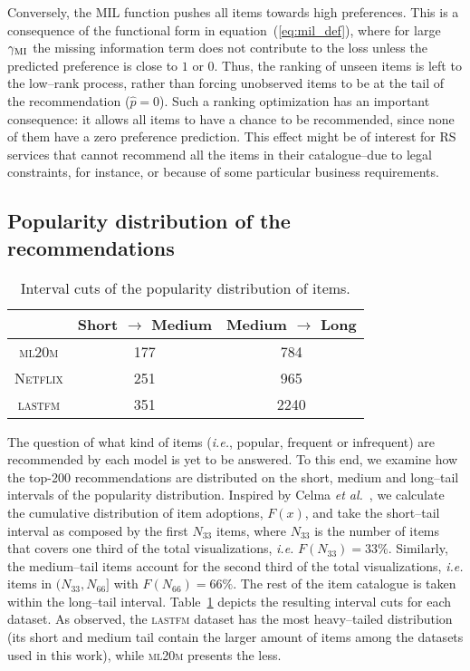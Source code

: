Conversely, the MIL function pushes all items towards high preferences. This is a consequence of the functional form in equation~(\ref{eq:mil_def}), where for large $\gamma_{\rm MI}$ the missing information term does not contribute to the loss unless the predicted preference is close to $1$ or $0$. Thus, the ranking of unseen items is left to the low--rank process, rather than forcing unobserved items to be at the tail of the recommendation ($\hat{p}=0$). Such a ranking optimization has an important consequence: it allows all items to have a chance to be recommended, since none of them have a zero preference prediction. This effect might be of interest for RS services that cannot recommend all the items in their catalogue--due to legal constraints, for instance, or because of some particular business requirements.

\subsection{Popularity distribution of the recommendations}
\begin{table}[htb]
\begin{tabular}{c c c}

\hline
\hline
  & Short $\rightarrow$ Medium & Medium $\rightarrow$ Long \\
\hline
\textsc{ml20m} & 177 & 784 \\
\textsc{Netflix} & 251 & 965 \\
\textsc{lastfm} & 351 & 2240 \\
\end{tabular}
\caption{
Interval cuts of the popularity distribution of items. 
}
\label{table:intervals_long_tail}
\end{table}

The question of what kind of items (\emph{i.e.}, popular, frequent or infrequent) are recommended by each model is yet to be answered. To this end, we examine how the top-200 recommendations are distributed on the short, medium and long--tail intervals of the popularity distribution. 
Inspired by Celma \emph{et al.}~\cite{Celma:2008:approach_novelty}, we calculate the cumulative distribution of item adoptions, $F(x)$, and take the short--tail interval as composed by the first $N_{33}$ items, where $N_{33}$ is the number of items that covers one third of the total visualizations, \emph{i.e.} $F(N_{33})=33 \%$. Similarly, the medium--tail items account for the second third of the total visualizations, \emph{i.e.} items in $(N_{33}, N_{66}]$ with $F(N_{66})=66 \%$. The rest of the item catalogue is taken within the long--tail interval. 
Table~\ref{table:intervals_long_tail} depicts the resulting interval cuts for each dataset. As observed, the \textsc{lastfm} dataset has the most heavy--tailed distribution (its short and medium tail contain the larger amount of items among the datasets used in this work), while \textsc{ml20m} presents the less. 

